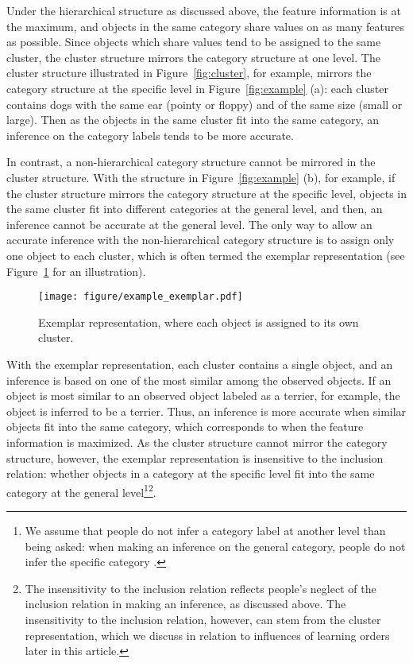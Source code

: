 \documentclass[doc]{apa6}
\begin{document}
Under the hierarchical structure as discussed above, the feature information is at the maximum, and
objects in the same category share values on as many features as possible.  Since objects which
share values tend to be assigned to the same cluster, the cluster structure mirrors the category
structure at one level.  The cluster structure illustrated in Figure~\ref{fig:cluster}, for example,
mirrors the category structure at the specific level in Figure~\ref{fig:example} (a): each cluster
contains dogs with the same ear (pointy or floppy) and of the same size (small or large).  Then as
the objects in the same cluster fit into the same category, an inference on the category labels
tends to be more accurate.

In contrast, a non-hierarchical category structure cannot be mirrored in the cluster structure.
With the structure in Figure~\ref{fig:example} (b), for example, if the cluster structure mirrors
the category structure at the specific level, objects in the same cluster fit into different
categories at the general level, and then, an inference cannot be accurate at the general level.
The only way to allow an accurate inference with the non-hierarchical category structure is to
assign only one object to each cluster, which is often termed the exemplar representation
\parencite{Nosofsky1986a, Nosofsky1991a} (see Figure~\ref{fig:exemplar} for an illustration).

\begin{figure}
    \centering

    \texttt{[image: figure/example\_exemplar.pdf]}
    \vspace{6pt}

    \caption{Exemplar representation, where each object is assigned to its own cluster.}

\label{fig:exemplar}
\end{figure}

With the exemplar representation, each cluster contains a single object, and an inference is based
on one of the most similar among the observed objects.  If an object is most similar to an observed
object labeled as a terrier, for example, the object is inferred to be a terrier.  Thus, an
inference is more accurate when similar objects fit into the same category, which corresponds to
when the feature information is maximized.  As the cluster structure cannot mirror the category
structure, however, the exemplar representation is insensitive to the inclusion relation: whether
objects in a category at the specific level fit into the same category at the general
level\footnote{We assume that people do not infer a category label at another level than being
asked: when making an inference on the general category, people do not infer the specific category
\parencite[see also,][]{Nosofsky2015a}.}\footnote{The insensitivity to the inclusion relation
reflects people's neglect of the inclusion relation in making an inference, as discussed above. The
insensitivity to the inclusion relation, however, can stem from the cluster representation, which we
discuss in relation to influences of learning orders later in this article.}.
\end{document}
